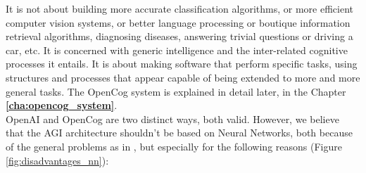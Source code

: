 It is not about building more accurate classification algorithms, or more efficient computer vision systems, or better language processing or boutique information retrieval algorithms, diagnosing diseases, answering trivial questions or driving a car, etc. It is concerned with generic intelligence and the inter-related cognitive processes it entails. It is about making software that perform specific tasks, using structures and processes that appear capable of being extended to more and more general tasks.
The OpenCog system is explained in detail later, in the Chapter \textbf{\ref{cha:opencog_system}}. \\
OpenAI and OpenCog are two distinct ways, both valid. However, we believe that the AGI architecture shouldn't be based on Neural Networks, both because of the general problems as in \cite{323037}, but especially for the following reasons (Figure \ref{fig:disadvantages_nn}):


